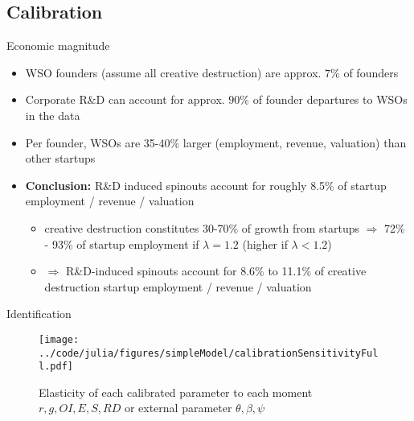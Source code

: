 \documentclass[english,usenames,dvipsnames]{beamer}
\begin{document}
\subsection{Calibration}

\begin{frame}{Economic magnitude}\label{economic_magnitude}
	\hyperlink{calibration_overview}{}
	\begin{itemize}
		\item WSO founders (assume all creative destruction) are approx. $7\%$ of founders  \hyperlink{results_of_match}{}
		\item Corporate R\&D can account for approx. $90\%$ of founder departures to WSOs in the data \hyperlink{regs_economic_significance}{}
		\item Per founder, WSOs are 35-40\% larger (employment, revenue, valuation) than other startups \hyperlink{regs_startup_lifecycle_employment}{} \hyperlink{regs_startup_lifecycle_revenue}{} \hyperlink{regs_startup_lifecycle_valuation}{}  \hyperlink{regs_startup_lifecycle_goingoutofbusiness}{} \hyperlink{regs_startup_lifecycle_successfullyexiting}{} 
		\item \alert{\textbf{Conclusion:}} R\&D induced spinouts account for roughly 8.5\% of startup employment / revenue / valuation
		\begin{itemize}
			\item creative destruction constitutes 30-70\% of growth from startups $\Rightarrow$ 72\% - 93\% of startup employment if $\lambda = 1.2$ (higher if $\lambda < 1.2$)
			\item $\Rightarrow$ R\&D-induced spinouts account for 8.6\% to 11.1\% of creative destruction startup employment / revenue / valuation
		\end{itemize}
	\end{itemize}
\end{frame}

\begin{frame}{Identification}\label{identification}\hyperlink{parameters}{} 
	\begin{figure}
		\texttt{[image: ../code/julia/figures/simpleModel/calibrationSensitivityFull.pdf]}
		\caption{\small Elasticity of each calibrated parameter to each moment $r,g,OI,E,S,RD$ or external parameter $\theta, \beta, \psi$}
	\end{figure}
\end{frame}
\end{document}
